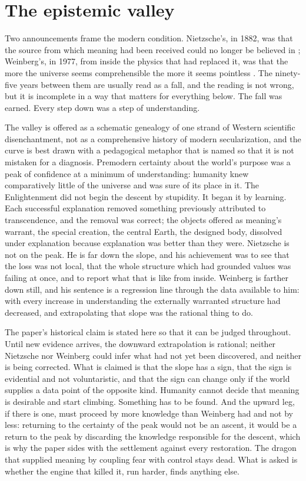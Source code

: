 \section{The epistemic valley}\label{sec:valley}

Two announcements frame the modern condition. Nietzsche's, in 1882, was
that the source from which meaning had been received could no longer be
believed in \cite{nietzsche1974gay}; Weinberg's, in 1977, from inside
the physics that had replaced it, was that the more the universe seems
comprehensible the more it seems pointless \cite{Weinberg77}. The
ninety-five years between them are usually read as a fall, and the
reading is not wrong, but it is incomplete in a way that matters for
everything below. The fall was earned. Every step down was a step of
understanding.

The valley is offered as a schematic genealogy of one strand of Western
scientific disenchantment, not as a comprehensive history of modern
secularization, and the curve is best drawn with a pedagogical metaphor
that is named so that it is not mistaken for a diagnosis. Premodern
certainty about the world's purpose was a peak of confidence at a
minimum of understanding: humanity knew comparatively little of the
universe and was sure of its place in it. The Enlightenment did not
begin the descent by stupidity. It began it by learning. Each successful
explanation removed something previously attributed to transcendence,
and the removal was correct; the objects offered as meaning's warrant,
the special creation, the central Earth, the designed body, dissolved
under explanation because explanation was better than they were.
Nietzsche is not on the peak. He is far down the slope, and his
achievement was to see that the loss was not local, that the whole
structure which had grounded values was failing at once, and to report
what that is like from inside. Weinberg is farther down still, and his
sentence is a regression line through the data available to him: with
every increase in understanding the externally warranted structure had
decreased, and extrapolating that slope was the rational thing to do.

The paper's historical claim is stated here so that it can be judged
throughout. Until new evidence arrives, the downward extrapolation is
rational; neither Nietzsche nor Weinberg could infer what had not yet
been discovered, and neither is being corrected. What is claimed is that
the slope has a sign, that the sign is evidential and not
voluntaristic, and that the sign can change only if the world supplies
a data point of the opposite kind. Humanity cannot decide that meaning
is desirable and start climbing. Something has to be found. And the
upward leg, if there is one, must proceed by more knowledge than
Weinberg had and not by less: returning to the certainty of the peak
would not be an ascent, it would be a return to the peak by discarding
the knowledge responsible for the descent, which is why the paper sides
with the settlement against every restoration. The dragon that supplied
meaning by coupling fear with control stays dead. What is asked is
whether the engine that killed it, run harder, finds anything else.

